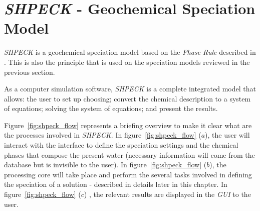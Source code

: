 
\chapter{\emph{SHPECK} - Geochemical Speciation Model}
\label{chapter:SHPECK}

\emph{SHPECK} is a geochemical speciation model based on the \emph{Phase Rule} described in \cite{Garrels:65}. This is also the principle that is used on the speciation models reviewed in the previous section. 

As a computer simulation software, \emph{SHPECK} is a complete integrated model that allows: the user to set up choosing; convert the chemical description to a system of equations; solving the system of equations; and present the results.

Figure~\ref{fig:shpeck_flow} represents a briefing overview to make it clear what are the processes involved in \emph{SHPECK}. In figure~\ref{fig:shpeck_flow} ($a$), the user will interact with the interface to define the speciation settings and the chemical phases that compose the present water (necessary information will come from the database but is invisible to the user). In figure~\ref{fig:shpeck_flow} ($b$), the processing core will take place and perform the several tasks involved in defining the speciation of a solution - described in details later in this chapter. In figure~\ref{fig:shpeck_flow} ($c$) , the relevant results are displayed in the \emph{GUI} to the user.

